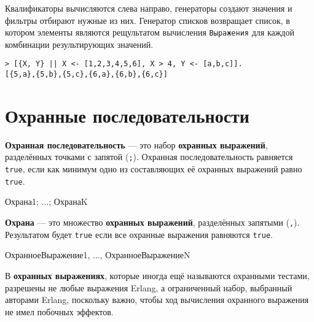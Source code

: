 Квалификаторы вычисляются слева направо, генераторы создают значения и фильтры 
отбирают нужные из них. Генератор списков возвращает список, в котором элементы 
являются рещультатом вычисления \texttt{Выражения} для каждой комбинации 
результирующих значений.

\begin{verbatim}
> [{X, Y} || X <- [1,2,3,4,5,6], X > 4, Y <- [a,b,c]].
[{5,a},{5,b},{5,c},{6,a},{6,b},{6,c}]
\end{verbatim}


\section{Охранные последовательности}

\textbf{Охранная последовательность} --- это набор \textbf{охранных выражений},
разделённых точками с запятой (\texttt{;}). Охранная последовательность равняется
\texttt{true}, если как минимум одно из составляющих её охранных выражений равно
\texttt{true}.

\begin{erlangru}
Охрана1; ...; ОхранаK
\end{erlangru}

\textbf{Охрана} --- это множество \textbf{охранных выражений}, разделённых запятыми
(\texttt{,}). Результатом будет \texttt{true} если все охранные выражения равняются
\texttt{true}.

\begin{erlangru}
ОхранноеВыражение1, ..., ОхранноеВыражениеN
\end{erlangru}

В \textbf{охранных выражениях}, которые иногда ещё называются охранными тестами,
разрешены не любые выражения Erlang, а ограниченный набор, выбранный авторами 
Erlang, поскольку важно, чтобы ход вычисления охранного выражения не имел побочных
эффектов.


